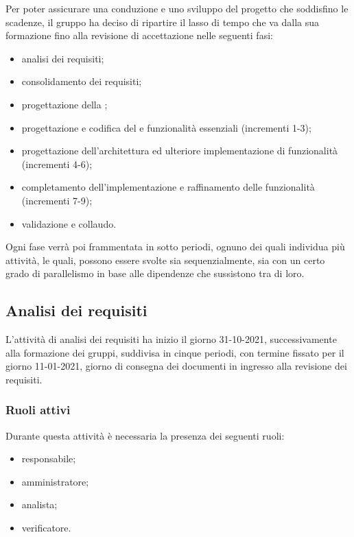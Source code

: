 Per poter assicurare una conduzione e uno sviluppo del progetto che soddisfino le scadenze, il gruppo ha deciso di ripartire il lasso di tempo che va dalla sua formazione fino alla revisione di accettazione nelle seguenti fasi: 

\begin{itemize} 
	\item analisi dei requisiti; 
	\item consolidamento dei requisiti; 
	\item progettazione della ;
	\item progettazione e codifica del  e funzionalità essenziali (incrementi 1-3);
	\item progettazione dell'architettura ed ulteriore implementazione di funzionalità (incrementi 4-6);
	\item completamento dell'implementazione e raffinamento delle funzionalità (incrementi 7-9);
	\item validazione e collaudo.
\end{itemize}
Ogni fase verrà poi frammentata in sotto periodi, ognuno dei quali individua più attività, le quali, possono essere svolte sia sequenzialmente, sia con un certo grado di parallelismo in base alle dipendenze che sussistono tra di loro. 


\subsection{Analisi dei requisiti} 
L’attività di analisi dei requisiti ha inizio il giorno 31-10-2021, successivamente alla formazione dei gruppi, suddivisa in cinque periodi, con termine fissato per il giorno 11-01-2021, giorno di consegna dei documenti in ingresso alla revisione dei requisiti. 

\subsubsection{Ruoli attivi} 
Durante questa attività è necessaria la presenza dei seguenti ruoli: 
\begin{itemize} 
	\item responsabile; 
	\item amministratore; 
	\item analista; 
	\item verificatore. 
\end{itemize} 

